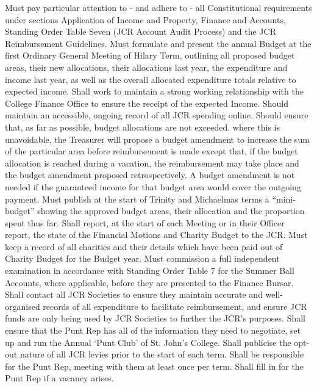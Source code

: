 Must pay particular attention to - and adhere to - all Constitutional requirements under sections Application of Income and Property, Finance and Accounts, Standing Order Table Seven (JCR Account Audit Process) and the JCR Reimbursement Guidelines.
Must formulate and present the annual Budget at the first Ordinary General Meeting of Hilary Term, outlining all proposed budget areas, their new allocations, their allocations last year, the expenditure and income last year, as well as the overall allocated expenditure totals relative to expected income.
Shall work to maintain a strong working relationship with the College Finance Office to ensure the receipt of the expected Income.
Should maintain an accessible, ongoing record of all JCR spending online.
Should ensure that, as far as possible, budget allocations are not exceeded. where this is unavoidable, the Treasurer will propose a budget amendment to increase the sum of the particular area before reimbursement is made except that, if the budget allocation is reached during a vacation, the reimbursement may take place and the budget amendment proposed retrospectively. A budget amendment is not needed if the guaranteed income for that budget area would cover the outgoing payment.
Must publish at the start of Trinity and Michaelmas terms a ``mini-budget'' showing the approved budget areas, their allocation and the proportion spent thus far. 
Shall report, at the start of each Meeting or in their Officer report, the state of the Financial Motions and Charity Budget to the JCR.
Must keep a record of all charities and their details which have been paid out of Charity Budget for the Budget year.
Must commission a full independent examination in accordance with Standing Order Table 7 for the Summer Ball Accounts, where applicable, before they are presented to the Finance Bursar.
Shall contact all JCR Societies to ensure they maintain accurate and well-organised records of all expenditure to facilitate reimbursement, and ensure JCR funds are only being used by JCR Societies to further the JCR's purposes.
Shall ensure that the Punt Rep has all of the information they need to negotiate, set up and run the Annual `Punt Club' of St. John's College.
Shall publicise the opt-out nature of all JCR levies prior to the start of each term.
Shall be responsible for the Punt Rep, meeting with them at least once per term.
Shall fill in for the Punt Rep if a vacancy arises.
